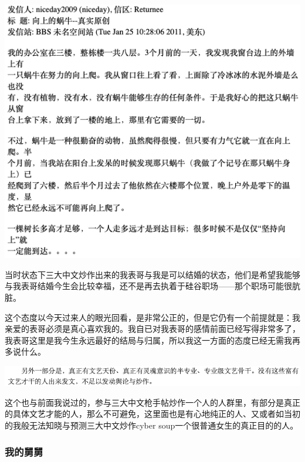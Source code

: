 \documentclass[9pt, b5paper]{article}
\begin{document}
\begin{center}
\includegraphics[width=.9\linewidth]{./pic/readme_20210520_095054.png}
\end{center}

当时状态下三大中文炒作出来的我表哥与我是可以结婚的状态，他们是希望我能够与我表哥结婚今生会比较幸福，还不是再去执着于硅谷职场——那个职场可能很肮脏。

这个态度以今天过来人的眼光回看，是非常公正的，但是它仍有一个前提就是：我亲爱的表哥必须是真心喜欢我的。我自已对我表哥的感情前面已经写得非常多了，我表哥这里是我今生永远最好的结局与归属，所以我这一方面的态度已经无需我再多说什么。

\begin{center}
\includegraphics[width=.9\linewidth]{./pic/readme_20210528_225603.png}
\end{center}

这个也与前面我说过的，参与三大中文枪手帖炒作一个人的人群里，有部分是真正的具体文艺才能的人，那么不可避免，这里面也是有心地纯正的人、又或者如当初的我般无法知晓与预测三大中文炒作cyber soup一个很普通女生的真正目的的人。 

\subsubsection{我的舅舅}
\label{sec:orgf5f475a}
\end{document}
